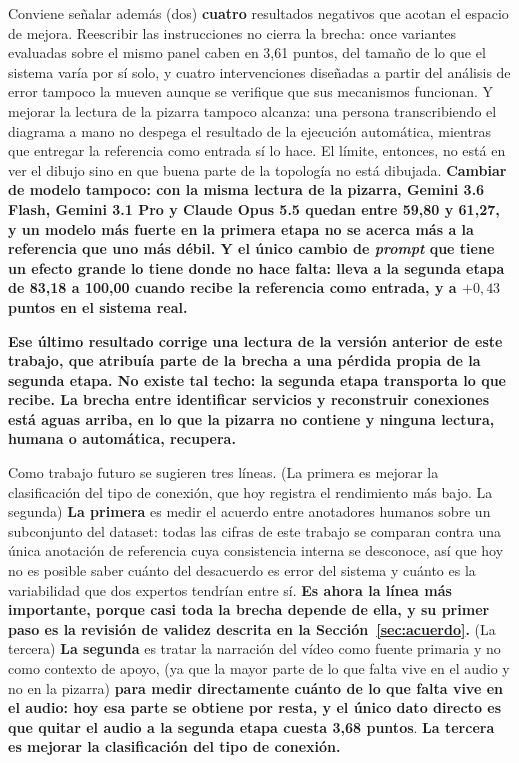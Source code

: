 \documentclass[a4paper, twocolumn, 10pt]{IEEEtran}
\newcommand{\nuevo}[1]{{\bfseries #1}}
\newcommand{\quitado}[1]{(#1)}
\begin{document}
Conviene señalar además \quitado{dos} \nuevo{cuatro} resultados negativos que acotan el espacio de mejora. Reescribir las instrucciones no cierra la brecha: once variantes evaluadas sobre el mismo panel caben en 3,61 puntos, del tamaño de lo que el sistema varía por sí solo, y cuatro intervenciones diseñadas a partir del análisis de error tampoco la mueven aunque se verifique que sus mecanismos funcionan. Y mejorar la lectura de la pizarra tampoco alcanza: una persona transcribiendo el diagrama a mano no despega el resultado de la ejecución automática, mientras que entregar la referencia como entrada sí lo hace. El límite, entonces, no está en ver el dibujo sino en que buena parte de la topología no está dibujada. \nuevo{Cambiar de modelo tampoco: con la misma lectura de la pizarra, Gemini 3.6 Flash, Gemini 3.1 Pro y Claude Opus 5.5 quedan entre 59,80 y 61,27, y un modelo más fuerte en la primera etapa no se acerca más a la referencia que uno más débil. Y el único cambio de \emph{prompt} que tiene un efecto grande lo tiene donde no hace falta: lleva a la segunda etapa de 83,18 a 100,00 cuando recibe la referencia como entrada, y a $+0{,}43$ puntos en el sistema real.}

\nuevo{Ese último resultado corrige una lectura de la versión anterior de este trabajo, que atribuía parte de la brecha a una pérdida propia de la segunda etapa. No existe tal techo: la segunda etapa transporta lo que recibe. La brecha entre identificar servicios y reconstruir conexiones está aguas arriba, en lo que la pizarra no contiene y ninguna lectura, humana o automática, recupera.}
 
Como trabajo futuro se sugieren tres líneas. \quitado{La primera es mejorar la clasificación del tipo de conexión, que hoy registra el rendimiento más bajo. La segunda} \nuevo{La primera} es medir el acuerdo entre anotadores humanos sobre un subconjunto del dataset: todas las cifras de este trabajo se comparan contra una única anotación de referencia cuya consistencia interna se desconoce, así que hoy no es posible saber cuánto del desacuerdo es error del sistema y cuánto es la variabilidad que dos expertos tendrían entre sí. \nuevo{Es ahora la línea más importante, porque casi toda la brecha depende de ella, y su primer paso es la revisión de validez descrita en la Sección~\ref{sec:acuerdo}.} \quitado{La tercera} \nuevo{La segunda} es tratar la narración del vídeo como fuente primaria y no como contexto de apoyo, \quitado{ya que la mayor parte de lo que falta vive en el audio y no en la pizarra} \nuevo{para medir directamente cuánto de lo que falta vive en el audio: hoy esa parte se obtiene por resta, y el único dato directo es que quitar el audio a la segunda etapa cuesta 3,68 puntos}. \nuevo{La tercera es mejorar la clasificación del tipo de conexión.}
 
 
 
 

 
\end{document}
